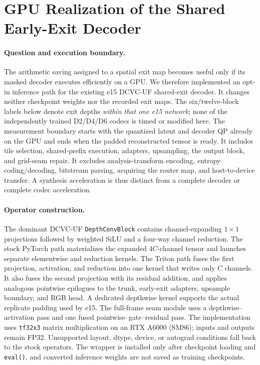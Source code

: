 \section{GPU Realization of the Shared Early-Exit Decoder}
\label{sec:cuda}

\paragraph{Question and execution boundary.}
The arithmetic saving assigned to a spatial exit map becomes useful only if
its masked decoder executes efficiently on a GPU. We therefore implemented
an opt-in inference path for the existing e15 DCVC-UF shared-exit decoder.
It changes neither checkpoint weights nor the recorded exit maps. The
six/twelve-block labels below denote exit depths \emph{within that one
e15 network}; none of the independently trained D2/D4/D6 codecs is timed
or modified here. The
measurement boundary starts with the quantized latent and decoder QP already
on the GPU and ends when the padded reconstructed tensor is ready. It
includes tile selection, shared-prefix execution, adapters, upsampling,
the output block, and grid-seam repair. It excludes analysis-transform
encoding, entropy coding/decoding, bitstream parsing, acquiring the router
map, and host-to-device transfer. A synthesis acceleration is thus distinct
from a complete decoder or complete codec acceleration.

\paragraph{Operator construction.}
The dominant DCVC-UF \texttt{DepthConvBlock} contains channel-expanding
$1\!\times\!1$ projections followed by weighted SiLU and a four-way
channel reduction. The stock PyTorch path materializes the expanded
$4C$-channel tensor and launches separate elementwise and reduction kernels.
The Triton path fuses the first projection, activation, and reduction into
one kernel that writes only $C$ channels. It also fuses the second projection
with its residual addition, and applies analogous pointwise epilogues to
the trunk, early-exit adapters, upsample boundary, and RGB head. A dedicated
depthwise kernel supports the actual replicate padding used by e15. The
full-frame seam module uses a depthwise--activation pass and one fused
pointwise--gate--residual pass. The implementation uses \texttt{tf32x3}
matrix multiplication on an RTX A6000 (SM86); inputs and outputs remain
FP32. Unsupported layout, dtype, device, or autograd conditions fall back
to the stock operators. The wrapper is installed only after checkpoint
loading and \texttt{eval()}, and converted inference weights are not saved
as training checkpoints.

